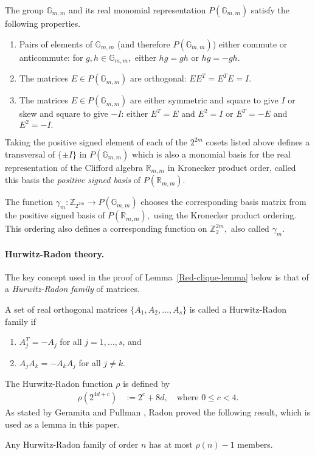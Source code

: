 \documentclass[11pt,a4paper]{jacodesmath}
\newcommand{\mb}[1]{\mathbb{#1}}
\newcommand{\G}{\mb{G}}
\newcommand{\R}{\mb{R}}
\newcommand{\Z}{\mb{Z}}
\newcommand{\Rep}{P}
\newcommand{\To}{\rightarrow}
\begin{document}
The group $\G_{m,m}$ and its real monomial representation $\Rep(\G_{m,m})$
satisfy the following properties.
\begin{enumerate}
\item
Pairs of elements of $\G_{m,m}$ (and therefore $\Rep(\G_{m,m})$) either commute or anti\-commute:
for $g, h \in \G_{m,m},$ either $h g = g h$ or $h g = - g h.$
\item
The matrices $E \in \Rep(\G_{m,m})$ are orthogonal: $E E^T = E^T E = I.$
\item
The matrices $E \in \Rep(\G_{m,m})$ are either symmetric and square to give $I$ or
skew and square to give $-I$: either $E^T = E$ and $E^2 =I$ or $E^T = -E$ and $E^2 = -I.$
\end{enumerate}

Taking the positive signed element of each of the $2^{2m}$ cosets listed above
defines a transversal of $\{\pm I\}$ in $\Rep(\G_{m,m})$
which is also a monomial basis for the real representation of the Clifford algebra $\R_{m,m}$ in
Kronecker product order,
called this basis the \emph{positive signed basis} of $\Rep(\R_{m,m}).$

The function $\gamma_m : \Z_{2^{2 m}} \To \Rep(\G_{m,m})$
chooses the corresponding basis matrix from the positive signed basis of $\Rep(\R_{m,m}),$
using the Kronecker product ordering.
This ordering also defines a corresponding function on $\Z_2^{2 m},$
also called $\gamma_m.$

\paragraph*{Hurwitz-Radon theory.}
\label{sec-Hurwitz-Radon}
The key concept used in the proof of Lemma~\ref{Red-clique-lemma} below is that of a
\emph{Hurwitz-Radon family} of matrices.
~

A set of real orthogonal matrices $\{A_1,A_2,\ldots,A_s\}$ is called a Hurwitz-Radon family
\cite{GerP74a,Hur22,Rad22} if
\begin{enumerate}
 \item
$A_j^T = -A_j$ for all $j=1,\ldots,s$, and
 \item
$A_j A_k = -A_k A_j$ for all $j \neq k$.
\end{enumerate}
The Hurwitz-Radon function $\rho$ is defined by
\begin{align*}
\rho(2^{4 d + c}) &:= 2^c + 8 d, \quad \text{where~} 0 \leqslant c < 4.
\end{align*}
As stated by Geramita and Pullman \cite{GerP74a}, Radon \cite{Rad22}
proved the following result, which is used as a lemma in this paper.
\begin{lemma}\label{Hurwitz-Radon-lemma}
\cite[Theorem A]{GerP74a}

Any Hurwitz-Radon family of order $n$ has at most $\rho(n)-1$ members.
\end{lemma}
\end{document}
